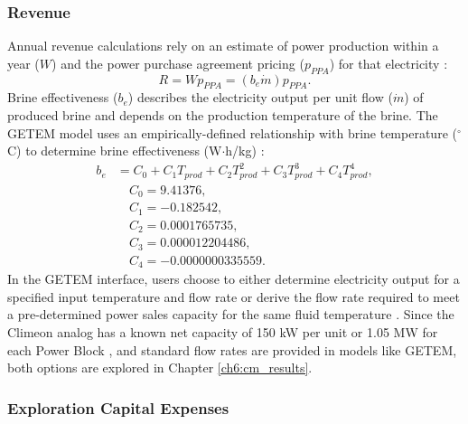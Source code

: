 \subsubsection{Revenue}\label{ch4:cm_rev}

Annual revenue calculations rely on an estimate of power production within a year ($W$) and the power purchase agreement pricing ($p_{PPA}$) for that electricity \citep{entingh_volume_2006}:
\begin{equation}
    \label{eq:cm_rev}
    R = W %
    p_{PPA} = (
    b_e %
    \dot{m}) %
    p_{PPA}.
\end{equation}
Brine effectiveness ($b_e$) describes the electricity output per unit flow ($\dot{m}$) of produced brine and depends on the production temperature of the brine. The GETEM model uses an empirically-defined relationship with brine temperature ($^\circ$C) to determine brine effectiveness (W$\cdot$h/kg) \citep[p.\ 62]{entingh_volume_2006}:
\begin{equation}
\begin{aligned}
    \label{eq:brine_eff}
    b_e &= C_0 + C_1 T_{prod} + C_2 T_{prod}^2 + C_3 T_{prod}^3 + C_4 T_{prod}^4, \\
    &\quad C_0 = 9.41376, \\
    &\quad C_1 = -0.182542, \\
    &\quad C_2 = 0.0001765735, \\
    &\quad C_3 = 0.000012204486, \\
    &\quad C_4 = -0.0000000335559.
\end{aligned}
\end{equation}
In the GETEM interface, users choose to either determine electricity output for a specified input temperature and flow rate or derive the flow rate required to meet a pre-determined power sales capacity for the same fluid temperature \citep{entingh_volume_2006}. Since the Climeon analog has a known net capacity of 150 kW per unit or 1.05 MW for each Power Block \citep{climeon_climeon_2021-1}, and standard flow rates are provided in models like GETEM, both options are explored in Chapter \ref{ch6:cm_results}.

\subsubsection{Exploration Capital Expenses}\label{ch4:cm_capex_expl}

